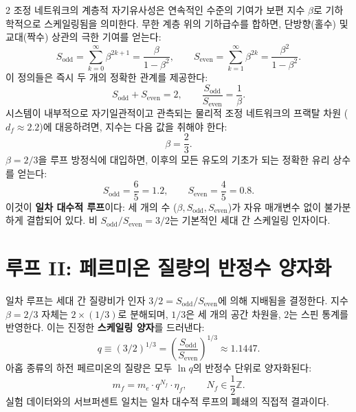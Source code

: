 \documentclass[12pt,a4paper]{article}
\begin{document}
\begin{multicols}{2}
		조정 네트워크의 계층적 자기유사성은 연속적인 수준의 기여가 보편 지수 \(\beta\)로 기하학적으로 스케일링됨을 의미한다. 무한 계층 위의 기하급수를 합하면, 단방향(홀수) 및 교대(짝수) 상관의 극한 기여를 얻는다:
		\begin{equation}
			S_{\mathrm{odd}} = \sum_{k=0}^{\infty} \beta^{2k+1} = \frac{\beta}{1-\beta^{2}}, \qquad
			S_{\mathrm{even}} = \sum_{k=1}^{\infty} \beta^{2k} = \frac{\beta^{2}}{1-\beta^{2}}.
		\end{equation}
		이 정의들은 즉시 두 개의 정확한 관계를 제공한다:
		\begin{equation}
			S_{\mathrm{odd}} + S_{\mathrm{even}} = 2, \qquad \frac{S_{\mathrm{odd}}}{S_{\mathrm{even}}} = \frac{1}{\beta}.
		\end{equation}
		시스템이 내부적으로 자기일관적이고 관측되는 물리적 조정 네트워크의 프랙탈 차원 (\(d_f \approx 2.2\))에 대응하려면, 지수는 다음 값을 취해야 한다:
		\begin{equation}
			\boxed{\beta = \frac{2}{3}}.
		\end{equation}
		\(\beta = 2/3\)을 루프 방정식에 대입하면, 이후의 모든 유도의 기초가 되는 정확한 유리 상수를 얻는다:
		\begin{equation}
			\boxed{S_{\mathrm{odd}} = \frac{6}{5} = 1.2, \qquad S_{\mathrm{even}} = \frac{4}{5} = 0.8.}
		\end{equation}
		이것이 \textbf{일차 대수적 루프}이다: 세 개의 수 (\(\beta, S_{\mathrm{odd}}, S_{\mathrm{even}}\))가 자유 매개변수 없이 불가분하게 결합되어 있다. 비 \(S_{\mathrm{odd}}/S_{\mathrm{even}} = 3/2\)는 기본적인 세대 간 스케일링 인자이다.
		
		\section{루프 II: 페르미온 질량의 반정수 양자화}
		
		일차 루프는 세대 간 질량비가 인자 \(3/2 = S_{\mathrm{odd}}/S_{\mathrm{even}}\)에 의해 지배됨을 결정한다. 지수 \(\beta = 2/3\) 자체는 \(2 \times (1/3)\)로 분해되며, \(1/3\)은 세 개의 공간 차원을, \(2\)는 스핀 통계를 반영한다. 이는 진정한 \textbf{스케일링 양자}를 드러낸다:
		\begin{equation}
			q \equiv (3/2)^{1/3} = \left( \frac{S_{\mathrm{odd}}}{S_{\mathrm{even}}} \right)^{1/3} \approx 1.1447.
		\end{equation}
		아홉 종류의 하전 페르미온의 질량은 모두 \(\ln q\)의 반정수 단위로 양자화된다:
		\begin{equation}
			m_f = m_e \cdot q^{N_f} \cdot \eta_f, \qquad N_f \in \frac{1}{2}\mathbb{Z}.
		\end{equation}
		실험 데이터와의 서브퍼센트 일치는 일차 대수적 루프의 폐쇄의 직접적 결과이다.
		

\end{multicols}
\end{document}
